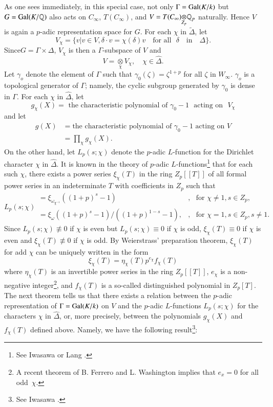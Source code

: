 As one sees immediately, in this special case, not only $\Gamma=\operatorname{Gal}(K/k)$ but $G=\operatorname{Gal}(K/\mathbb{Q})$ also acts on $C_{\infty}$, $T(C_{\infty})$, and $V=\foprod{T(C_{\infty})}{\mathbb{Q}_{p}}{Z_{p}}$ naturally. Hence $V$ is again a $p$-adic representation space for $G$. For each $\chi$ in $\widetilde{\Delta}$, let
$$
V_{\chi}=\{v|v\in V,\delta\cdot v=\chi(\delta)v\text{~~ for all~~} \delta \text{~~ in ~~}\Delta\}.
$$
Since\pageoriginale $G=\Gamma\times \Delta$, $V_{\chi}$ is then a $\Gamma$-subspace of $V$ and
$$
V={\displaystyle{\mathop{\otimes}\limits_{\chi}}}V_{\chi},\quad \chi \in \widehat{\Delta}.
$$
Let $\gamma_{o}$ denote the element of $\Gamma$ such that $\gamma_{0}(\zeta)=\zeta^{1+p}$ for all $\zeta$ in $W_{\infty}$. $\gamma_{o}$ is a topological generator of $\Gamma$; namely, the cyclic subgroup generated by $\gamma_{0}$ is dense in $\Gamma$. For each $\chi$ in $\widehat{\Delta}$, let
$$
g_{\chi}(X)=\text{~the characteristic polynomial of } \gamma_{0}-1\text{~ acting on~ } V_{\chi}
$$
and let
\begin{align*}
g(X) &= \text{the characteristic polynomial of $\gamma_{0}-1$ acting on $V$}\\
&= \prod\limits_{\chi}g_{\chi}(X).
\end{align*}
On the other hand, let $L_{p}(s;\chi)$ denote the $p$-adic $L$-function for the Dirichlet character $\chi$ in $\widehat{\Delta}$. It is known in the theory of $p$-adic $L$-functions\footnote[2]{See Iwasawa \cite{art4-key4} or Lang \cite{art4-key6}.} that for each such $\chi$, there exists a power series $\xi_{\chi}(T)$ in the ring $Z_{p}[[T]]$ of all formal power series in an indeterminate $T$ with coefficients in $Z_{p}$ such that
$$
L_{p}(s;\chi)
\begin{array}{ll}
=\xi_{\omega_{\chi^{-1}}}((1+p)^{s}-1) & ,\text{~ for } \chi\neq 1, s\in Z_{p},\\
=\xi_{\omega}((1+p)^{s}-1)/((1+p)^{1-s}-1), & ,\text{~ for } \chi=1, s\in Z_{p},s\neq 1.
\end{array}
$$
Since $L_{p}(s;\chi)\nequiv 0$ if $\chi$ is even but $L_{p}(s;\chi)\equiv 0$ if $\chi$ is odd, $\xi_{\chi}(T)\equiv 0$ if $\chi$ is even and $\xi_{\chi}(T)\nequiv 0$ if $\chi$ is odd. By Weierstrass' preparation theorem, $\xi_{\chi}(T)$ for add $\chi$ can be uniquely written in the form
$$
\xi_{\chi}(T)=\eta_{\chi}(T)p^{e_{\chi}}f_{\chi}(T)
$$
where $\eta_{\chi}(T)$ is an invertible power series in the ring $Z_{p}[[T]]$, $e_{\chi}$ is a non-negative integer\footnote[3]{A recent theorem of B. Ferrero and L. Washington implies that $e_{x}=0$ for all odd~$\chi$.}, and $f_{\chi}(T)$ is a so-called distinguished polynomial in $Z_{p}[T]$. The next theorem tells us that there exists a relation between the $p$-adic representation of $\Gamma=\operatorname{Gal}(K/k)$ on $V$ and the $p$-adic $L$-functions $L_{p}(s;\chi)$ for the characters $\chi$ in $\widehat{\Delta}$, or, more precisely, between the polynomials $g_{\chi}(X)$ and $f_{\chi}(T)$ defined above. Namely, we have the following result\footnote[4]{See Iwasawa \cite{art4-key3}.}: 

